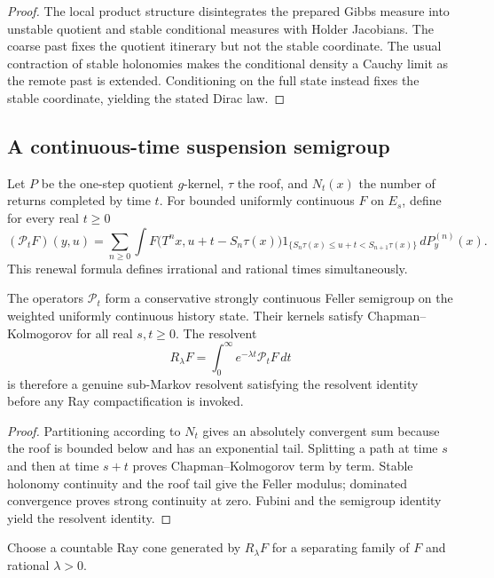 \begin{proof}
The local product structure disintegrates the prepared Gibbs measure into
unstable quotient and stable conditional measures with Holder Jacobians.  The
coarse past fixes the quotient itinerary but not the stable coordinate.  The
usual contraction of stable holonomies makes the conditional density a
Cauchy limit as the remote past is extended.  Conditioning on the full state
instead fixes the stable coordinate, yielding the stated Dirac law.
\end{proof}

\subsection{A continuous-time suspension semigroup}

Let $P$ be the one-step quotient $g$-kernel, $\tau$ the roof, and
$N_t(x)$ the number of returns completed by time $t$.  For bounded uniformly
continuous $F$ on $E_s$, define for every real $t\ge0$
\[
 (\mathcal P_tF)(y,u)=
 \sum_{n\ge0}\int
 F\bigl(T^nx,u+t-S_n\tau(x)\bigr)
 1_{\{S_n\tau(x)\le u+t<S_{n+1}\tau(x)\}}
 \,dP_y^{(n)}(x).
\]
This renewal formula defines irrational and rational times simultaneously.

\begin{theorem}
\label{thm:r7-a4-feller}
The operators $\mathcal P_t$ form a conservative strongly continuous Feller
semigroup on the weighted uniformly continuous history state.  Their kernels
satisfy Chapman--Kolmogorov for all real $s,t\ge0$.  The resolvent
\[
 R_\lambda F=\int_0^\infty e^{-\lambda t}\mathcal P_tF\,dt
\]
is therefore a genuine sub-Markov resolvent satisfying the resolvent identity
before any Ray compactification is invoked.
\end{theorem}

\begin{proof}
Partitioning according to $N_t$ gives an absolutely convergent sum because the
roof is bounded below and has an exponential tail.  Splitting a path at time
$s$ and then at time $s+t$ proves Chapman--Kolmogorov term by term.  Stable
holonomy continuity and the roof tail give the Feller modulus; dominated
convergence proves strong continuity at zero.  Fubini and the semigroup
identity yield the resolvent identity.
\end{proof}

Choose a countable Ray cone generated by $R_\lambda F$ for a separating family
of $F$ and rational $\lambda>0$.

